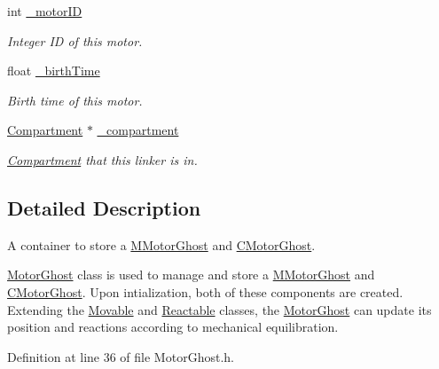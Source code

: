 \begin{DoxyCompactItemize}
int \hyperlink{classMotorGhost_a8af6f4cdc0bd8ab2300b6f4bba550f1c}{\+\_\+motor\+I\+D}
\begin{DoxyCompactList}\small\item\em Integer I\+D of this motor. \end{DoxyCompactList}\item 
float \hyperlink{classMotorGhost_a7b33616ae53f08cf2095d30090a4fa82}{\+\_\+birth\+Time}
\begin{DoxyCompactList}\small\item\em Birth time of this motor. \end{DoxyCompactList}\item 
\hyperlink{classCompartment}{Compartment} $\ast$ \hyperlink{classMotorGhost_a3a16b996a9a4a7e51735b410e65d339c}{\+\_\+compartment}
\begin{DoxyCompactList}\small\item\em \hyperlink{classCompartment}{Compartment} that this linker is in. \end{DoxyCompactList}\end{DoxyCompactItemize}


\subsection{Detailed Description}
A container to store a \hyperlink{classMMotorGhost}{M\+Motor\+Ghost} and \hyperlink{classCMotorGhost}{C\+Motor\+Ghost}. 

\hyperlink{classMotorGhost}{Motor\+Ghost} class is used to manage and store a \hyperlink{classMMotorGhost}{M\+Motor\+Ghost} and \hyperlink{classCMotorGhost}{C\+Motor\+Ghost}. Upon intialization, both of these components are created. Extending the \hyperlink{classMovable}{Movable} and \hyperlink{classReactable}{Reactable} classes, the \hyperlink{classMotorGhost}{Motor\+Ghost} can update its position and reactions according to mechanical equilibration. 

Definition at line 36 of file Motor\+Ghost.\+h.



